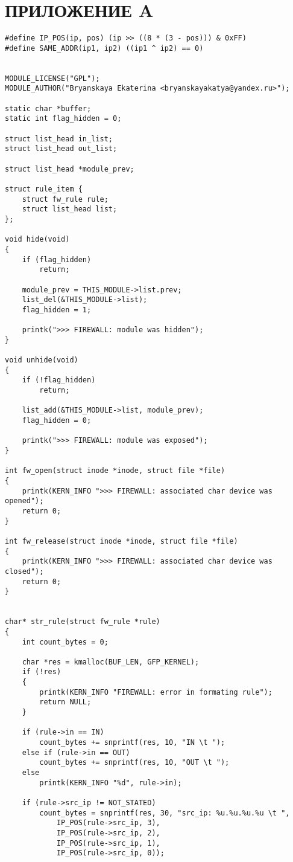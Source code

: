 \section*{ПРИЛОЖЕНИЕ A}
\begin{lstlisting}[caption = {Загружаемый модуль}, label=lst:code_module]
#define IP_POS(ip, pos) (ip >> ((8 * (3 - pos))) & 0xFF)
#define SAME_ADDR(ip1, ip2) ((ip1 ^ ip2) == 0)


MODULE_LICENSE("GPL");
MODULE_AUTHOR("Bryanskaya Ekaterina <bryanskayakatya@yandex.ru>");

static char *buffer;
static int flag_hidden = 0;

struct list_head in_list;
struct list_head out_list;

struct list_head *module_prev;

struct rule_item {
	struct fw_rule rule;
	struct list_head list;    
};

void hide(void)
{
	if (flag_hidden)
		return;
	
	module_prev = THIS_MODULE->list.prev;
	list_del(&THIS_MODULE->list);
	flag_hidden = 1;
	
	printk(">>> FIREWALL: module was hidden");
}

void unhide(void)
{
	if (!flag_hidden)
		return;
	
	list_add(&THIS_MODULE->list, module_prev);
	flag_hidden = 0;
	
	printk(">>> FIREWALL: module was exposed");
} 

int fw_open(struct inode *inode, struct file *file)
{
	printk(KERN_INFO ">>> FIREWALL: associated char device was opened");
	return 0;
}

int fw_release(struct inode *inode, struct file *file)
{
	printk(KERN_INFO ">>> FIREWALL: associated char device was closed");
	return 0;
}


char* str_rule(struct fw_rule *rule)
{
	int count_bytes = 0;
	
	char *res = kmalloc(BUF_LEN, GFP_KERNEL);
	if (!res)
	{
		printk(KERN_INFO "FIREWALL: error in formating rule");
		return NULL;
	}
	
	if (rule->in == IN)
		count_bytes += snprintf(res, 10, "IN \t ");
	else if (rule->in == OUT)
		count_bytes += snprintf(res, 10, "OUT \t ");
	else
		printk(KERN_INFO "%d", rule->in);
	
	if (rule->src_ip != NOT_STATED)
		count_bytes = snprintf(res, 30, "src_ip: %u.%u.%u.%u \t ", 
			IP_POS(rule->src_ip, 3), 
			IP_POS(rule->src_ip, 2),
			IP_POS(rule->src_ip, 1),
			IP_POS(rule->src_ip, 0));
	

\end{lstlisting}
